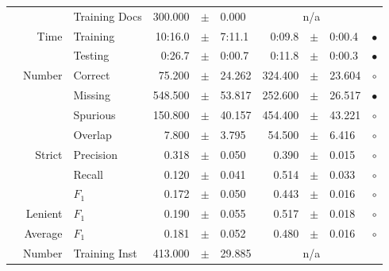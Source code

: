 \begin{longtable}{|r|r|l||rcl|rcl|c|}
\cline{3-10} &                             &   Training Docs &     300.000 &  $\pm$  &       0.000 &    \multicolumn{3}{c|}{n/a}         &  \\
\cline{2-10} & \multirow{2}{*}{      Time} &        Training &     10:16.0 &  $\pm$  &      7:11.1 &      0:09.8 &  $\pm$  &      0:00.4 & $\bullet$ \\
\cline{3-10} &                             &         Testing &      0:26.7 &  $\pm$  &      0:00.7 &      0:11.8 &  $\pm$  &      0:00.3 & $\bullet$ \\
\hline
\pagebreak
\hline
\hline
\multirow{11}{*}{\begin{sideways}purchabr\end{sideways} }
             & \multirow{4}{*}{    Number} &         Correct &      75.200 &  $\pm$  &      24.262 &     324.400 &  $\pm$  &      23.604 & $\circ$ \\
\cline{3-10} &                             &         Missing &     548.500 &  $\pm$  &      53.817 &     252.600 &  $\pm$  &      26.517 & $\bullet$ \\
\cline{3-10} &                             &        Spurious &     150.800 &  $\pm$  &      40.157 &     454.400 &  $\pm$  &      43.221 & $\circ$ \\
\cline{3-10} &                             &         Overlap &       7.800 &  $\pm$  &       3.795 &      54.500 &  $\pm$  &       6.416 & $\circ$ \\
\cline{2-10} & \multirow{3}{*}{    Strict} &       Precision &       0.318 &  $\pm$  &       0.050 &       0.390 &  $\pm$  &       0.015 & $\circ$ \\
\cline{3-10} &                             &          Recall &       0.120 &  $\pm$  &       0.041 &       0.514 &  $\pm$  &       0.033 & $\circ$ \\
\cline{3-10} &                             &           $F_1$ &       0.172 &  $\pm$  &       0.050 &       0.443 &  $\pm$  &       0.016 & $\circ$ \\
\cline{2-10} &                     Lenient &           $F_1$ &       0.190 &  $\pm$  &       0.055 &       0.517 &  $\pm$  &       0.018 & $\circ$ \\
\cline{2-10} &                     Average &           $F_1$ &       0.181 &  $\pm$  &       0.052 &       0.480 &  $\pm$  &       0.016 & $\circ$ \\
\cline{2-10} & \multirow{2}{*}{    Number} &   Training Inst &     413.000 &  $\pm$  &      29.885 &    \multicolumn{3}{c|}{n/a}         &  \\

\end{longtable}
